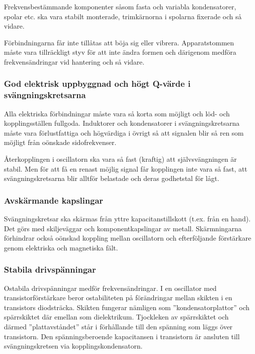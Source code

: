 Frekvensbestämmande komponenter såsom fasta och variabla kondensatorer, spolar
etc. ska vara stabilt monterade, trimkärnorna i spolarna fixerade och så vidare.

Förbindningarna får inte tillåtas att böja sig eller vibrera.
Apparatstommen måste vara tillräckligt styv för att inte ändra formen och
därigenom medföra frekvensändringar vid hantering och så vidare.

\subsubsection{God elektrisk uppbyggnad och högt Q-värde i svängningskretsarna}

Alla elektriska förbindningar måste vara så korta som möjligt och löd- och
kopplingsställen fullgoda.
Induktorer och kondensatorer i svängningskretsarna måste vara förlustfattiga
och högvärdiga i övrigt så att signalen blir så ren som möjligt från oönskade
sidofrekvenser.

Återkopplingen i oscillatorn ska vara så fast (kraftig) att självsvängningen
är stabil.
Men för att få en renast möjlig signal får kopplingen inte vara så fast,
att svängningskretsarna blir alltför belastade och deras godhetstal för lågt.

\subsubsection{Avskärmande kapslingar}

Svängningskretsar ska skärmas från yttre kapacitanstillskott
(t.ex. från en hand).
Det görs med skiljeväggar och komponentkapslingar av metall.
Skärmningarna förhindrar också oönskad koppling mellan oscillatorn och
efterföljande förstärkare genom elektriska och magnetiska fält.

\subsubsection{Stabila drivspänningar}

Ostabila drivspänningar medför frekvensändringar.
I en oscillator med transistorförstärkare beror ostabiliteten på förändringar
mellan skikten i en transistors diodsträcka.
Skikten fungerar nämligen som ''kondensatorplattor'' och spärrskiktet där
emellan som dielektrikum.
Tjockleken av spärrskiktet och därmed ''plattavståndet'' står i förhållande
till den spänning som läggs över transistorn.
Den spänningsberoende kapacitansen i transistorn är ansluten till
svängningskretsen via kopplingskondensatorn.

